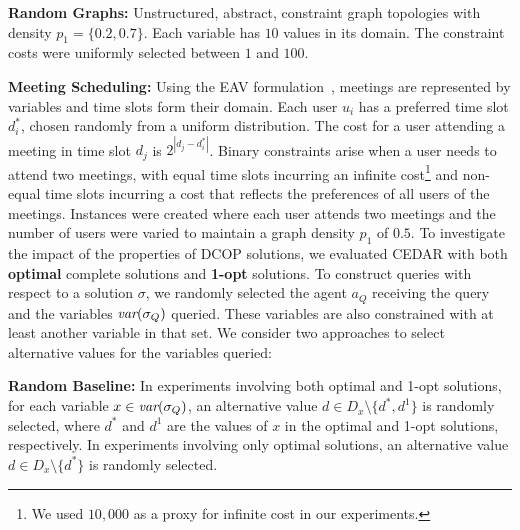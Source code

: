 \documentclass[twoside,11pt]{article}
\begin{document}
\squishlist
\item \textbf{Random Graphs:} Unstructured, abstract, constraint graph topologies with density $p_1 = \{0.2, 0.7 \}$. Each variable has $10$ values in its domain. The constraint costs were uniformly selected between $1$ and $100$. 

\item \textbf{Meeting Scheduling:} 
Using the EAV formulation~\cite{maheswaran:04a}, meetings are represented by variables and time slots form their domain. 
Each user $u_i$ has a preferred time slot $d_i^{*}$, chosen randomly from a uniform distribution. The cost for a user attending a meeting in time slot $d_j$ is $2^{|d_j - d_i^{*}|}$. Binary constraints arise when a user needs to attend two meetings, with equal time slots incurring an infinite cost\footnote{We used $10,\!000$ as a proxy for infinite cost in our experiments.} and non-equal time slots incurring a cost that reflects the preferences of all users of the meetings. 
Instances were created where each user attends two meetings and the number of users were varied to maintain a graph density $p_1$ of $0.5$. %
\squishend
To investigate the impact of the properties of DCOP solutions, we evaluated CEDAR with both \textbf{optimal} complete solutions and \textbf{1-opt} solutions. To construct queries with respect to a solution $\sigma$, we randomly selected the agent $a_Q$ receiving the query and the variables ${\textit{var}(\sigma_Q)}$ queried. These variables are also constrained with at least another variable in that set. We consider two approaches to select alternative values for the variables queried:
\squishlist
\item {\bf Random Baseline:} In experiments involving both optimal and 1-opt solutions, for each variable $x \in {\textit{var}(\sigma_Q)}$, an alternative value $d \in D_{x} \setminus \{d^*, d^{1}\}$ is randomly selected, where $d^*$ and $d^1$ are the values of $x$ in the optimal and 1-opt solutions, respectively. %
In experiments involving only optimal solutions, an alternative value $d \in D_{x} \setminus \{d^*\}$ is randomly selected.
\end{document}
